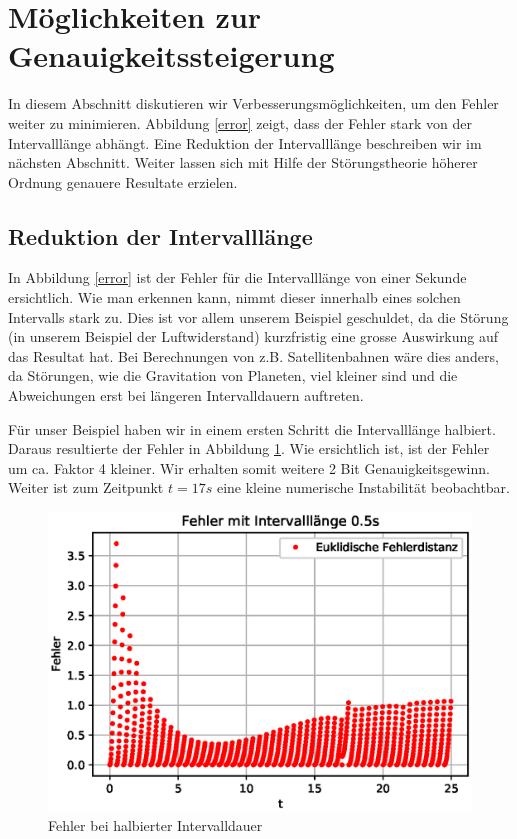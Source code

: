 \section{Möglichkeiten zur Genauigkeitssteigerung
\label{perturbation:section:weitereverbesserungen}}
In diesem Abschnitt diskutieren wir Verbesserungsmöglichkeiten, um den Fehler weiter zu minimieren.
Abbildung \ref{error} zeigt, dass der Fehler stark von der Intervalllänge abhängt.
Eine Reduktion der Intervalllänge beschreiben wir im nächsten Abschnitt.
Weiter lassen sich mit Hilfe der Störungstheorie höherer Ordnung genauere Resultate erzielen.

\subsection{Reduktion der Intervalllänge}
In Abbildung \ref{error} ist der Fehler für die Intervalllänge von einer Sekunde ersichtlich.
Wie man erkennen kann, nimmt dieser innerhalb eines solchen Intervalls stark zu.
Dies ist vor allem unserem Beispiel geschuldet, da die Störung (in unserem Beispiel der Luftwiderstand) kurzfristig eine grosse Auswirkung auf das Resultat hat.
Bei Berechnungen von z.B. Satellitenbahnen wäre dies anders, da Störungen,
wie die Gravitation von Planeten, viel kleiner sind und die Abweichungen erst bei längeren Intervalldauern auftreten.

Für unser Beispiel haben wir in einem ersten Schritt die Intervalllänge halbiert.
Daraus resultierte der Fehler in Abbildung \ref{errorShortInterval}.
Wie ersichtlich ist, ist der Fehler um ca. Faktor 4 kleiner.
Wir erhalten somit weitere 2 Bit Genauigkeitsgewinn.
Weiter ist zum Zeitpunkt $t=17s$ eine kleine numerische Instabilität beobachtbar.

\begin{figure}
    \centering
    \includegraphics[scale=0.7]{papers/perturbation/bilder/perturbation_fig4.eps}
    \caption{Fehler bei halbierter Intervalldauer}
	\label{errorShortInterval}
\end{figure}

